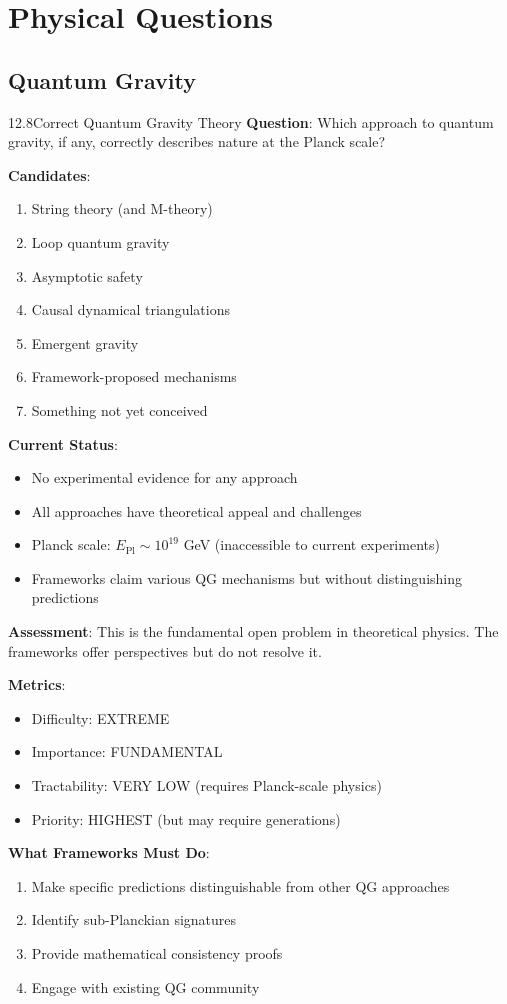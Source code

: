 \section{Physical Questions}

\subsection{Quantum Gravity}

\begin{openproblem}{12.8}{Correct Quantum Gravity Theory}
\textbf{Question}: Which approach to quantum gravity, if any, correctly describes nature at the Planck scale?

\textbf{Candidates}:
\begin{enumerate}
    \item String theory (and M-theory)
    \item Loop quantum gravity
    \item Asymptotic safety
    \item Causal dynamical triangulations
    \item Emergent gravity
    \item Framework-proposed mechanisms
    \item Something not yet conceived
\end{enumerate}

\textbf{Current Status}:
\begin{itemize}
    \item No experimental evidence for any approach
    \item All approaches have theoretical appeal and challenges
    \item Planck scale: $E_{\text{Pl}} \sim 10^{19}$ GeV (inaccessible to current experiments)
    \item Frameworks claim various QG mechanisms but without distinguishing predictions
\end{itemize}

\textbf{Assessment}: This is the fundamental open problem in theoretical physics. The frameworks offer perspectives but do not resolve it.

\textbf{Metrics}:
\begin{itemize}
    \item Difficulty: EXTREME
    \item Importance: FUNDAMENTAL
    \item Tractability: VERY LOW (requires Planck-scale physics)
    \item Priority: HIGHEST (but may require generations)
\end{itemize}

\textbf{What Frameworks Must Do}:
\begin{enumerate}
    \item Make specific predictions distinguishable from other QG approaches
    \item Identify sub-Planckian signatures
    \item Provide mathematical consistency proofs
    \item Engage with existing QG community
\end{enumerate}
\end{openproblem}

